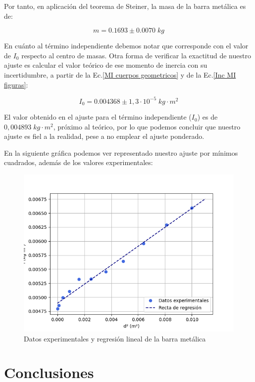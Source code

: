 \documentclass[a4paper,12pt,titlepage]{article}
\begin{document}
Por tanto, en aplicación del teorema de Steiner, la masa de la barra metálica es de:

\begin{equation}
    m = 0.1693 \pm 0.0070 \; kg
\end{equation}

En cuánto al término independiente debemos notar que corresponde con el valor de $I_0$ respecto al centro de masas. Otra forma de verificar la exactitud de nuestro ajuste es calcular el valor teórico de ese momento de inercia con su incertidumbre, a partir de la Ec.\ref{MI cuerpos geometricos} y de la Ec.\ref{Inc MI figuras}:

\begin{equation}
    I_0 = 0.004368 \pm 1,3 \cdot 10^{-5} \; kg \cdot m^2
\end{equation}

El valor obtenido en el ajuste para el término independiente ($I_0$) es de $0,004893 \; kg\cdot m^2$, próximo al teórico, por lo que podemos concluir que nuestro ajuste es fiel a la realidad, pese a no emplear el ajuste ponderado.

En la siguiente gráfica podemos ver representado nuestro ajuste por mínimos cuadrados, además de los valores experimentales:

\begin{figure}[h!]
    \centering
    \includegraphics[width=0.75\linewidth]{Images/regSteiner2.png}
    \caption{Datos experimentales y regresión lineal de la barra metálica}
\end{figure}

\newpage

\section{Conclusiones}
\end{document}
